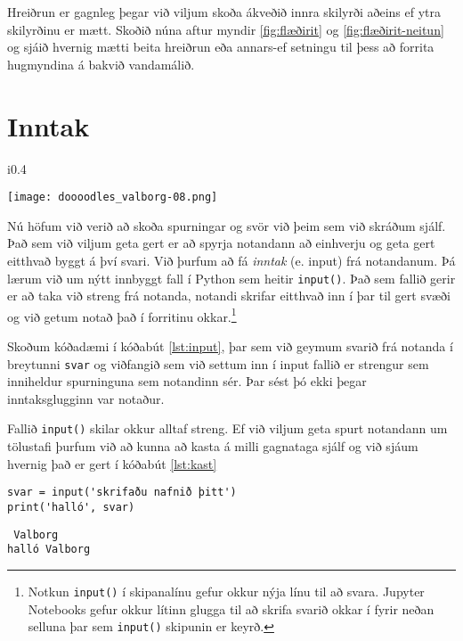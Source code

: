 Hreiðrun er gagnleg þegar við viljum skoða ákveðið innra skilyrði aðeins ef ytra skilyrðinu er mætt.
Skoðið núna aftur myndir \ref{fig:flæðirit} og \ref{fig:flæðirit-neitun} og sjáið hvernig mætti beita hreiðrun eða annars-ef setningu til þess að forrita hugmyndina á bakvið vandamálið.

\section{Inntak}
\begin{wrapfigure}{i}{0.4\textwidth} %
	\begin{center}
		\texttt{[image: doooodles\_valborg-08.png]}
	\end{center}
\end{wrapfigure}
Nú höfum við verið að skoða spurningar og svör við þeim sem við skráðum sjálf.
Það sem við viljum geta gert er að spyrja notandann að einhverju og geta gert eitthvað byggt á því svari.
Við þurfum að fá \emph{inntak} (e. input) frá notandanum.
Þá lærum við um nýtt innbyggt fall í Python sem heitir \texttt{input()}.
Það sem fallið gerir er að taka við streng frá notanda, notandi skrifar eitthvað inn í þar til gert svæði og við getum notað það í forritinu okkar.\footnote{Notkun \texttt{input()} í skipanalínu gefur okkur nýja línu til að svara.
	Jupyter Notebooks gefur okkur lítinn glugga til að skrifa svarið okkar í fyrir neðan selluna þar sem \texttt{input()} skipunin er keyrð.}

Skoðum kóðadæmi í kóðabút \ref{lst:input}, þar sem við geymum svarið frá notanda í breytunni \texttt{svar} og viðfangið sem við settum inn í input fallið er strengur sem inniheldur spurninguna sem notandinn sér.
Þar sést þó ekki þegar inntaksglugginn var notaður.

Fallið \texttt{input()} skilar okkur alltaf streng.
Ef við viljum geta spurt notandann um tölustafi þurfum við að kunna að kasta á milli gagnataga sjálf og við sjáum hvernig það er gert í kóðabút \ref{lst:kast}


\begin{lstlisting}[caption=input() fallið notað, label=lst:input]
svar = input('skrifaðu nafnið þitt')
print('halló', svar)
\end{lstlisting}
\lstset{style=uttak}
\begin{lstlisting}
 Valborg
halló Valborg
\end{lstlisting}
\lstset{style=venjulegt}

